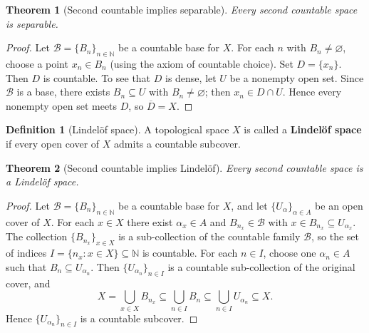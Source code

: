 \documentclass[11pt,a4paper,twoside]{book}
\newtheorem{theorem}{Theorem}[section]
\theoremstyle{remark}
\theoremstyle{definition}
\theoremstyle{definition}
\newtheorem{definition}{Definition}[section]
\begin{document}
\begin{theorem}[Second countable implies separable]
\label{thm:2nd-countable-separable}
Every second countable space is separable.
\end{theorem}

\begin{proof}
Let $\mathscr{B}=\{B_n\}_{n\in\mathbb{N}}$ be a countable base for $X$.  For
each $n$ with $B_n\neq\varnothing$, choose a point $x_n\in B_n$ (using the
axiom of countable choice).  Set $D=\{x_n\}$.  Then $D$ is countable.  To see
that $D$ is dense, let $U$ be a nonempty open set.  Since $\mathscr{B}$ is a
base, there exists $B_n\subseteq U$ with $B_n\neq\varnothing$; then
$x_n\in D\cap U$.  Hence every nonempty open set meets $D$, so
$\overline{D}=X$.
\end{proof}

\begin{definition}[Lindel\"{o}f space]
\label{def:lindelof}
A topological space $X$ is called a \textbf{Lindel\"{o}f space} if every open
cover of $X$ admits a countable subcover.
\end{definition}

\begin{theorem}[Second countable implies Lindel\"{o}f]
\label{thm:2nd-countable-lindelof}
Every second countable space is a Lindel\"{o}f space.
\end{theorem}

\begin{proof}
Let $\mathscr{B}=\{B_n\}_{n\in\mathbb{N}}$ be a countable base for $X$, and
let $\{U_\alpha\}_{\alpha\in A}$ be an open cover of $X$.  For each $x\in X$
there exist $\alpha_x\in A$ and $B_{n_x}\in\mathscr{B}$ with
$x\in B_{n_x}\subseteq U_{\alpha_x}$.  The collection
$\{B_{n_x}\}_{x\in X}$ is a sub-collection of the countable family
$\mathscr{B}$, so the set of indices $I=\{n_x : x\in X\}\subseteq\mathbb{N}$
is countable.  For each $n\in I$, choose one $\alpha_n\in A$ such that
$B_n\subseteq U_{\alpha_n}$.  Then
$\{U_{\alpha_n}\}_{n\in I}$ is a countable sub-collection of the original
cover, and
\[
    X
    = \bigcup_{x\in X} B_{n_x}
    \subseteq \bigcup_{n\in I} B_n
    \subseteq \bigcup_{n\in I} U_{\alpha_n}
    \subseteq X.
\]
Hence $\{U_{\alpha_n}\}_{n\in I}$ is a countable subcover.
\end{proof}

\end{document}
